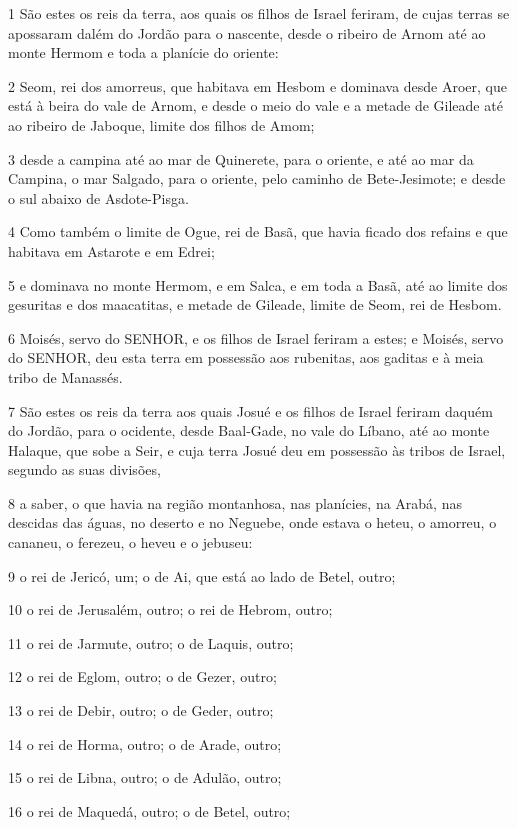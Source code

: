 \par 1 São estes os reis da terra, aos quais os filhos de Israel feriram, de cujas terras se apossaram dalém do Jordão para o nascente, desde o ribeiro de Arnom até ao monte Hermom e toda a planície do oriente:
\par 2 Seom, rei dos amorreus, que habitava em Hesbom e dominava desde Aroer, que está à beira do vale de Arnom, e desde o meio do vale e a metade de Gileade até ao ribeiro de Jaboque, limite dos filhos de Amom;
\par 3 desde a campina até ao mar de Quinerete, para o oriente, e até ao mar da Campina, o mar Salgado, para o oriente, pelo caminho de Bete-Jesimote; e desde o sul abaixo de Asdote-Pisga.
\par 4 Como também o limite de Ogue, rei de Basã, que havia ficado dos refains e que habitava em Astarote e em Edrei;
\par 5 e dominava no monte Hermom, e em Salca, e em toda a Basã, até ao limite dos gesuritas e dos maacatitas, e metade de Gileade, limite de Seom, rei de Hesbom.
\par 6 Moisés, servo do SENHOR, e os filhos de Israel feriram a estes; e Moisés, servo do SENHOR, deu esta terra em possessão aos rubenitas, aos gaditas e à meia tribo de Manassés.
\par 7 São estes os reis da terra aos quais Josué e os filhos de Israel feriram daquém do Jordão, para o ocidente, desde Baal-Gade, no vale do Líbano, até ao monte Halaque, que sobe a Seir, e cuja terra Josué deu em possessão às tribos de Israel, segundo as suas divisões,
\par 8 a saber, o que havia na região montanhosa, nas planícies, na Arabá, nas descidas das águas, no deserto e no Neguebe, onde estava o heteu, o amorreu, o cananeu, o ferezeu, o heveu e o jebuseu:
\par 9 o rei de Jericó, um; o de Ai, que está ao lado de Betel, outro;
\par 10 o rei de Jerusalém, outro; o rei de Hebrom, outro;
\par 11 o rei de Jarmute, outro; o de Laquis, outro;
\par 12 o rei de Eglom, outro; o de Gezer, outro;
\par 13 o rei de Debir, outro; o de Geder, outro;
\par 14 o rei de Horma, outro; o de Arade, outro;
\par 15 o rei de Libna, outro; o de Adulão, outro;
\par 16 o rei de Maquedá, outro; o de Betel, outro;

